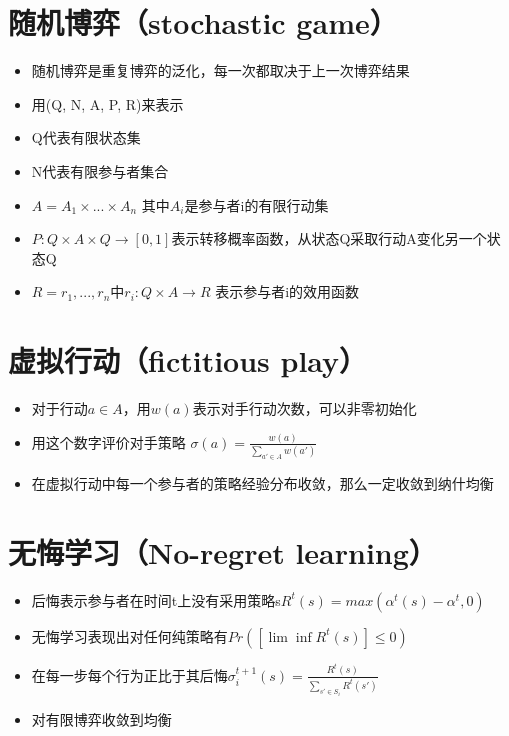 \documentclass[]{book}
\providecommand{\tightlist}{%
  \setlength{\itemsep}{0pt}\setlength{\parskip}{0pt}}
\begin{document}
\hypertarget{stochastic-game}{%
\section{随机博弈（stochastic game）}\label{stochastic-game}}

\begin{itemize}
\tightlist
\item
  随机博弈是重复博弈的泛化，每一次都取决于上一次博弈结果
\item
  用(Q, N, A, P, R)来表示
\item
  Q代表有限状态集
\item
  N代表有限参与者集合
\item
  \(A = A_1 \times ... \times A_n\) 其中\(A_i\)是参与者i的有限行动集
\item
  \(P:Q \times A \times Q \rightarrow[0,1]\)表示转移概率函数，从状态Q采取行动A变化另一个状态Q
\item
  \(R = r_1,...,r_n\)中\(r_i:Q\times A\rightarrow R\) 表示参与者i的效用函数
\end{itemize}

\hypertarget{fictitious-play}{%
\section{虚拟行动（fictitious play）}\label{fictitious-play}}

\begin{itemize}
\tightlist
\item
  对于行动\(a\in A\)，用\(w(a)\)表示对手行动次数，可以非零初始化
\item
  用这个数字评价对手策略 \(\sigma(a) = \frac{w(a)}{\sum_{a' \in A}w(a')}\)
\item
  在虚拟行动中每一个参与者的策略经验分布收敛，那么一定收敛到纳什均衡
\end{itemize}

\hypertarget{no-regret-learning}{%
\section{无悔学习（No-regret learning）}\label{no-regret-learning}}

\begin{itemize}
\tightlist
\item
  后悔表示参与者在时间t上没有采用策略s\(R^t(s) = max(\alpha^t(s)-\alpha^t,0)\)
\item
  无悔学习表现出对任何纯策略有\(Pr([\lim \inf R^t(s)]\leq0)\)
\item
  在每一步每个行为正比于其后悔\(\sigma_i^{t+1}(s) = \frac{R^t(s)}{\sum_{s'\in S_i}R^t(s')}\)
\item
  对有限博弈收敛到均衡
\end{itemize}
\end{document}
